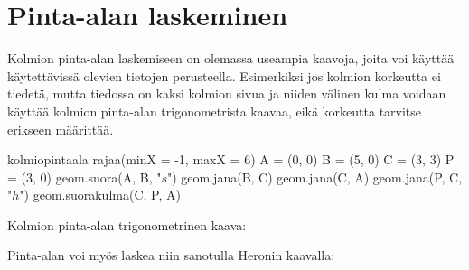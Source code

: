 \section*{Pinta-alan laskeminen}

Kolmion pinta-alan laskemiseen on olemassa useampia kaavoja, joita voi käyttää käytettävissä olevien tietojen perusteella. Esimerkiksi jos kolmion korkeutta ei tiedetä, mutta tiedossa on kaksi kolmion sivua ja niiden välinen kulma voidaan käyttää  kolmion pinta-alan trigonometrista kaavaa, eikä korkeutta tarvitse erikseen määrittää.

\begin{luoKuva}{kolmiopintaala}
	rajaa(minX = -1, maxX = 6)
	A = (0, 0)
	B = (5, 0)
	C = (3, 3)
	P = (3, 0)
	geom.suora(A, B, "$s$")
	geom.jana(B, C)
	geom.jana(C, A)
	geom.jana(P, C, "$h$")
	geom.suorakulma(C, P, A)
\end{luoKuva}

Kolmion pinta-alan trigonometrinen kaava:


Pinta-alan voi myös laskea niin sanotulla Heronin kaavalla: 



